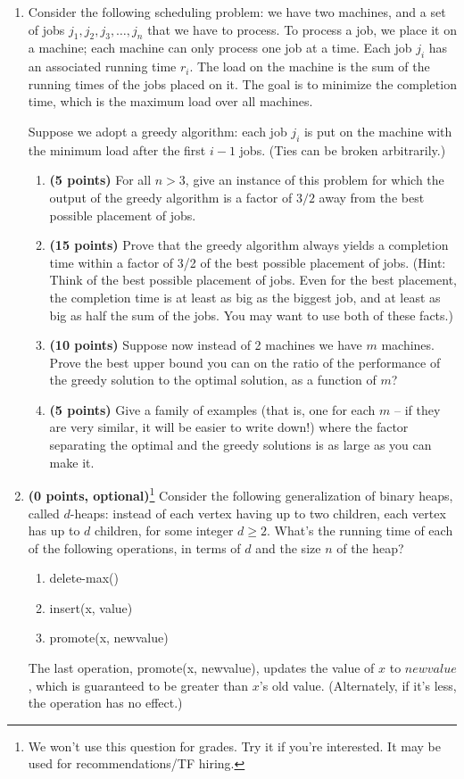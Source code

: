 \documentclass[10pt]{article}
\begin{document}
\begin{enumerate}
\item Consider the following scheduling problem: we have two machines,
and a set of jobs $j_1,j_2,j_3,\ldots,j_n$ that we have to process.
To process a job, we place it on a machine;
each machine can only process one job at a time. 
Each job $j_i$ has an associated running time $r_i$.  The load on the 
machine is the sum of the running times of the jobs placed on it. 
The goal is to minimize the completion time, which is the maximum load
over all machines.  

Suppose we adopt a greedy algorithm: each job $j_i$ is put on the
machine with the minimum load after the first $i-1$ jobs.  (Ties can
be broken arbitrarily.) 
\begin{enumerate}
\item
{\bf (5 points)} 
For all $n > 3$, give an instance of this problem for which
the output of the greedy algorithm is a factor of $3/2$ away from the best
possible placement of jobs.
\item
{\bf (15 points)} 
Prove that the greedy algorithm always yields a completion
time within a factor of 3/2 of the best possible placement of jobs.
(Hint: Think of the best possible placement of jobs.  Even for the
best placement, the completion time is at least as big as the biggest
job, and at least as big as half the sum of the jobs.  You may want to
use both of these facts.)
\item
{\bf (10 points)} 
Suppose now instead of 2 machines we have $m$ machines.  
Prove the best upper bound you can on the ratio of the 
performance of the greedy solution to the optimal solution, as a
function of $m$? 
\item
{\bf (5 points)} 
Give a family of examples (that is, one for
each $m$ -- if they are very similar, it will be easier to write
down!) where the factor separating the optimal and the greedy solutions
is as large as you can make it.
\end{enumerate}


\item 
{\bf (0 points, optional)}\footnote{We won't use this question for grades. Try it if you're interested. 
It may be used for recommendations/TF hiring.}
Consider the following generalization of binary heaps, called $d$-heaps: instead of each vertex having up to two children, each vertex has up to $d$ children, for some integer $d \ge 2$. What's the running time of each of the following operations, in terms of $d$ and the size $n$ of the heap?
\begin{enumerate}
\item delete-max()
\item insert(x, value)
\item promote(x, newvalue)
\end{enumerate}
The last operation, promote(x, newvalue), updates the value of $x$ to $newvalue$, which is guaranteed to be greater than $x$'s old value. (Alternately, if it's less, the operation has no effect.)


\end{enumerate}
\end{document}
